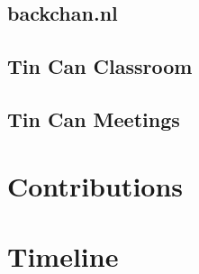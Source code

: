 \documentclass{tufte-handout}
\begin{document}
\subsection{backchan.nl}
\subsection{Tin Can Classroom}
\subsection{Tin Can Meetings}


\section{Contributions}

\section{Timeline}





\end{document}
